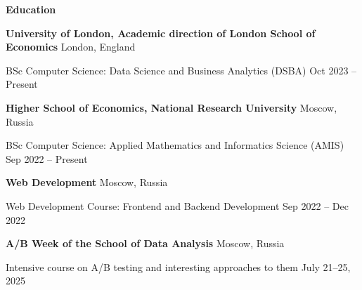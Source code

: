 \begin{center}
    \textbf{Education}
\end{center}

\textbf{University of London, Academic direction of London School of Economics} \hfill London, England

BSc Computer Science: Data Science and Business Analytics (DSBA) \hfill Oct 2023 – Present

\textbf{Higher School of Economics, National Research University} \hfill Moscow, Russia

BSc Computer Science: Applied Mathematics and Informatics Science (AMIS) \hfill Sep 2022 – Present

\textbf{Web Development} \hfill Moscow, Russia

Web Development Course: Frontend and Backend Development \hfill Sep 2022 – Dec 2022

\textbf{A/B Week of the School of Data Analysis} \hfill Moscow, Russia

Intensive course on A/B testing and interesting approaches to them \hfill July 21–25, 2025